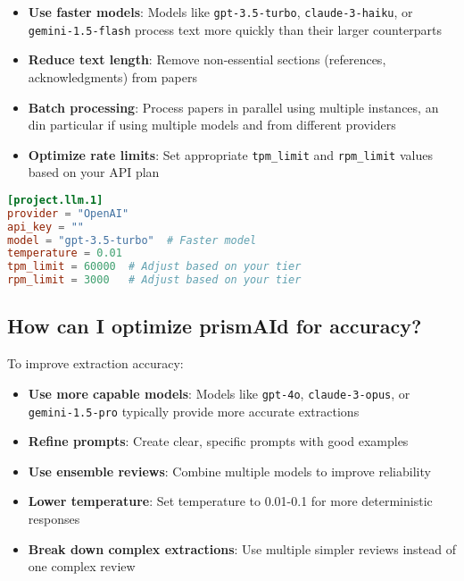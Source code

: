 \begin{itemize}
    \item \textbf{Use faster models}: Models like \texttt{gpt-3.5-turbo}, \texttt{claude-3-haiku}, or \texttt{gemini-1.5-flash} process text more quickly than their larger counterparts
    \item \textbf{Reduce text length}: Remove non-essential sections (references, acknowledgments) from papers
    \item \textbf{Batch processing}: Process papers in parallel using multiple instances, an din particular if using multiple models and from different providers
    \item \textbf{Optimize rate limits}: Set appropriate \texttt{tpm\_limit} and \texttt{rpm\_limit} values based on your API plan
\end{itemize}

\begin{configbox}
\begin{lstlisting}[language=TOML]
[project.llm.1]
provider = "OpenAI"
api_key = ""
model = "gpt-3.5-turbo"  # Faster model
temperature = 0.01
tpm_limit = 60000  # Adjust based on your tier
rpm_limit = 3000   # Adjust based on your tier
\end{lstlisting}
\end{configbox}

\subsection{How can I optimize prismAId for accuracy?}

To improve extraction accuracy:

\begin{itemize}
    \item \textbf{Use more capable models}: Models like \texttt{gpt-4o}, \texttt{claude-3-opus}, or \texttt{gemini-1.5-pro} typically provide more accurate extractions
    \item \textbf{Refine prompts}: Create clear, specific prompts with good examples
    \item \textbf{Use ensemble reviews}: Combine multiple models to improve reliability
    \item \textbf{Lower temperature}: Set temperature to 0.01-0.1 for more deterministic responses
    \item \textbf{Break down complex extractions}: Use multiple simpler reviews instead of one complex review
\end{itemize}

